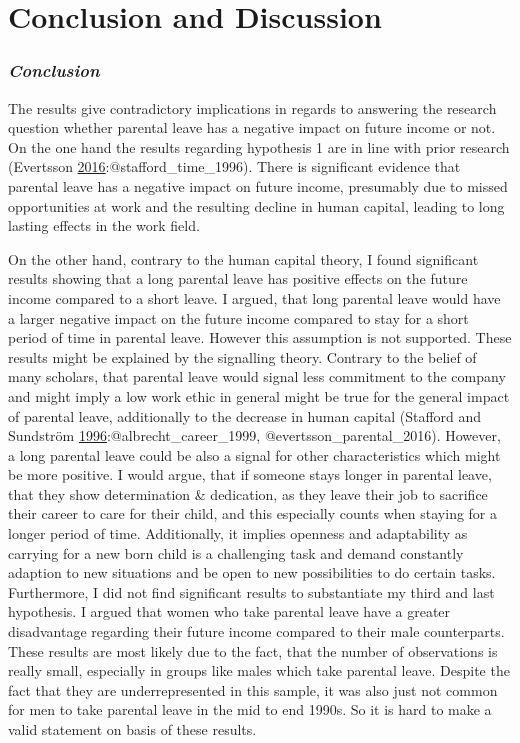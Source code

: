 \documentclass[
  12pt,
]{article}
\begin{document}
\hypertarget{conclusion-and-discussion}{%
\section{Conclusion and Discussion}\label{conclusion-and-discussion}}

\hypertarget{conclusion}{%
\subsubsection*{\texorpdfstring{\emph{Conclusion}}{Conclusion}}\label{conclusion}}

The results give contradictory implications in regards to answering the research question whether parental leave has a negative impact on future income or not. On the one hand the results regarding hypothesis 1 are in line with prior research (Evertsson \protect\hyperlink{ref-evertsson_parental_2016}{2016}:@stafford\_time\_1996). There is significant evidence that parental leave has a negative impact on future income, presumably due to missed opportunities at work and the resulting decline in human capital, leading to long lasting effects in the work field.

On the other hand, contrary to the human capital theory, I found significant results showing that a long parental leave has positive effects on the future income compared to a short leave.
I argued, that long parental leave would have a larger negative impact on the future income compared to stay for a short period of time in parental leave. However this assumption is not supported.
These results might be explained by the signalling theory. Contrary to the belief of many scholars, that parental leave would signal less commitment to the company and might imply a low work ethic in general might be true for the general impact of parental leave, additionally to the decrease in human capital (Stafford and Sundström \protect\hyperlink{ref-stafford_time_1996}{1996}:@albrecht\_career\_1999, @evertsson\_parental\_2016). However, a long parental leave could be also a signal for other characteristics which might be more positive. I would argue, that if someone stays longer in parental leave, that they show determination \& dedication, as they leave their job to sacrifice their career to care for their child, and this especially counts when staying for a longer period of time. Additionally, it implies openness and adaptability as carrying for a new born child is a challenging task and demand constantly adaption to new situations and be open to new possibilities to do certain tasks.
Furthermore, I did not find significant results to substantiate my third and last hypothesis. I argued that women who take parental leave have a greater disadvantage regarding their future income compared to their male counterparts. These results are most likely due to the fact, that the number of observations is really small, especially in groups like males which take parental leave. Despite the fact that they are underrepresented in this sample, it was also just not common for men to take parental leave in the mid to end 1990s.
So it is hard to make a valid statement on basis of these results.
\end{document}
